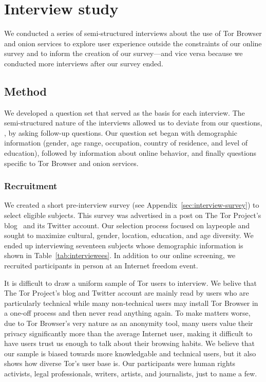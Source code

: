 \section{Interview study}
\label{sec:interview-study}

We conducted a series of semi-structured interviews about the use of Tor
Browser and onion services to explore user experience outside the constraints
of our online survey and to inform the creation of our survey---and vice versa
because we conducted more interviews after our survey ended.

\subsection{Method}

We developed a question set that served as the basis for each interview.  The
semi-structured nature of the interviews allowed us to deviate from our
questions, \eg, by asking follow-up questions.  Our question set began with
demographic information (gender, age range, occupation, country of residence,
and level of education), followed by information about online behavior, and
finally questions specific to Tor Browser and onion services.

\subsubsection{Recruitment}

We created a short pre-interview survey (see
Appendix~\ref{sec:interview-survey}) to select eligible subjects.  This survey
was advertised in a post on The Tor Project's blog~\cite{Winter2017a} and its
Twitter account.  Our selection process focused on laypeople and sought to
maximize cultural, gender, location, education, and age diversity.  We ended up
interviewing seventeen subjects whose demographic information is shown in
Table~\ref{tab:interviewees}.  In addition to our online screening, we
recruited participants in person at an Internet freedom event.

It is difficult to draw a uniform sample of Tor users to interview. We belive
that The Tor Project's blog and Twitter account are mainly read by users who
are particularly technical while many non-technical users may install Tor
Browser in a one-off process and then never read anything again.  To make
matters worse, due to Tor Browser's very nature as an anonymity tool, many
users value their privacy significantly more than the average Internet user,
making it difficult to have users trust us enough to talk about their browsing
habits.  We believe that our sample is biased towards more knowledgable and
technical users, but it also shows how diverse Tor's user base is.  Our
participants were human rights activists, legal professionals, writers,
artists, and journalists, just to name a few.

